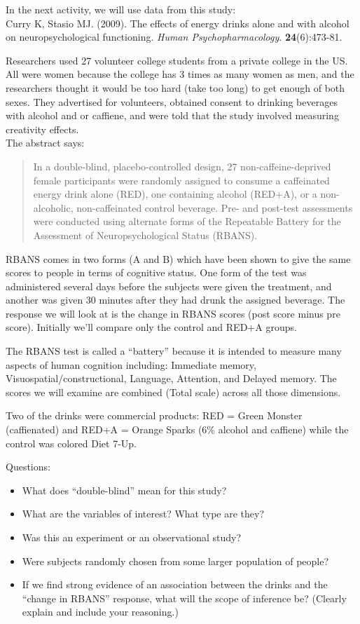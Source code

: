 \def\theTopic{Reading 12}

In the next activity, we will use data  from this study:\\
 Curry K, Stasio MJ.  (2009). The effects of energy drinks alone and with
 alcohol on neuropsychological functioning. {\it Human  Psychopharmacology}.
{\bf 24}(6):473-81. 

Researchers used 27 volunteer college students from a private college
in the US. All were women because the college has 3 times as many
women as men, and the researchers thought it would be too hard (take
too long)  to get enough of both sexes. They advertised for
volunteers, obtained consent to drinking beverages with alcohol and or
caffiene, and were told that the study involved measuring creativity
effects. \\
The abstract says:

\begin{quotation}
  In a double-blind, placebo-controlled design, 27
  non-caffeine-deprived female participants were randomly assigned to
  consume a caffeinated energy drink alone (RED), one containing
  alcohol (RED+A), or a non-alcoholic, non-caffeinated control
  beverage. Pre- and post-test assessments were conducted using
  alternate forms of the Repeatable Battery for the Assessment of
  Neuropsychological Status (RBANS).
\end{quotation}

RBANS comes in two forms (A and B) which have been shown to give the
same scores to people in terms of cognitive status.  One form of the
test was administered several days before the subjects were given the
treatment, and another was given 30 minutes after they had drunk the
assigned beverage.  The response we will look at is the change in
RBANS scores (post score minus pre score). Initially we'll compare
only the control and RED+A groups.

The RBANS test is called a ``battery'' because it is intended to measure
many aspects of human cognition including: Immediate memory,
Visuospatial/constructional, Language, Attention, and  Delayed
memory. The scores we will examine are combined (Total scale) across
all those dimensions.  

Two of the drinks were commercial products: RED = Green Monster
(caffienated) and RED+A = Orange Sparks (6\% alcohol and caffiene)
while the control was colored Diet 7-Up.

Questions:
\begin{itemize}
\item What does ``double-blind'' mean for this study? \vfill
\item What are the variables of interest? What type are they?\vfill
\item Was this an experiment or an observational study?\vfill
\item Were subjects randomly chosen from some larger population of
  people?\vfill
\item If we find strong evidence of an association between the drinks
  and the ``change in RBANS'' response, what will the scope of
  inference be?  (Clearly explain and include your reasoning.)
\end{itemize}